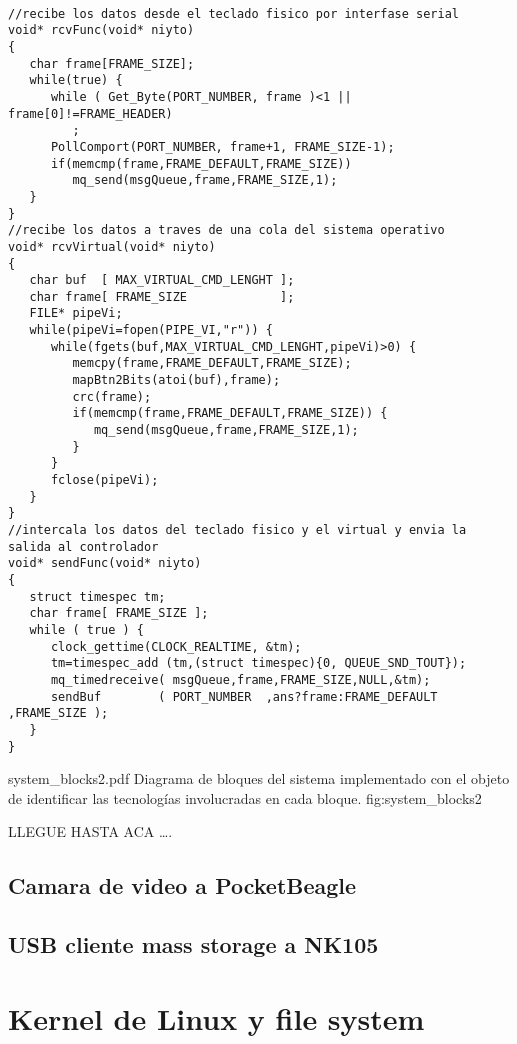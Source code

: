 \begin{lstlisting}[label=cod:handheld1,caption=Funcion de intercalado de datos entre el teclado fisico y el virtual utilizando colas.]

//recibe los datos desde el teclado fisico por interfase serial
void* rcvFunc(void* niyto)
{
   char frame[FRAME_SIZE];
   while(true) {
      while ( Get_Byte(PORT_NUMBER, frame )<1 || frame[0]!=FRAME_HEADER)
         ;
      PollComport(PORT_NUMBER, frame+1, FRAME_SIZE-1);
      if(memcmp(frame,FRAME_DEFAULT,FRAME_SIZE))
         mq_send(msgQueue,frame,FRAME_SIZE,1);
   }
}
//recibe los datos a traves de una cola del sistema operativo
void* rcvVirtual(void* niyto)
{
   char buf  [ MAX_VIRTUAL_CMD_LENGHT ];
   char frame[ FRAME_SIZE             ];
   FILE* pipeVi;
   while(pipeVi=fopen(PIPE_VI,"r")) {
      while(fgets(buf,MAX_VIRTUAL_CMD_LENGHT,pipeVi)>0) {
         memcpy(frame,FRAME_DEFAULT,FRAME_SIZE);
         mapBtn2Bits(atoi(buf),frame);
         crc(frame);
         if(memcmp(frame,FRAME_DEFAULT,FRAME_SIZE)) {
            mq_send(msgQueue,frame,FRAME_SIZE,1);
         }
      }
      fclose(pipeVi);
   }
}
//intercala los datos del teclado fisico y el virtual y envia la salida al controlador 
void* sendFunc(void* niyto)
{
   struct timespec tm;
   char frame[ FRAME_SIZE ];
   while ( true ) {
      clock_gettime(CLOCK_REALTIME, &tm);
      tm=timespec_add (tm,(struct timespec){0, QUEUE_SND_TOUT});
      mq_timedreceive( msgQueue,frame,FRAME_SIZE,NULL,&tm);
      sendBuf        ( PORT_NUMBER  ,ans?frame:FRAME_DEFAULT ,FRAME_SIZE );
   }
}
\end{lstlisting}


         {system_blocks2.pdf}
         {Diagrama de bloques del sistema implementado con el objeto de identificar las tecnologías involucradas en cada bloque.}
         {fig:system_blocks2}

LLEGUE HASTA ACA \ldots.

   \subsection{Camara de video a PocketBeagle}
   \subsection{USB cliente mass storage a NK105}
\section{Kernel de Linux y file system}
